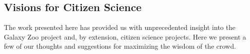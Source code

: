 \documentclass[twocolumn]{aastex6}
\begin{document}

\subsection{Visions for Citizen Science}
The work presented here has provided us with unprecedented insight into the Galaxy
Zoo project and, by extension, citizen science projects. Here we present a few of 
our thoughts and suggestions for maximizing the wisdom of the crowd. 
\end{document}
